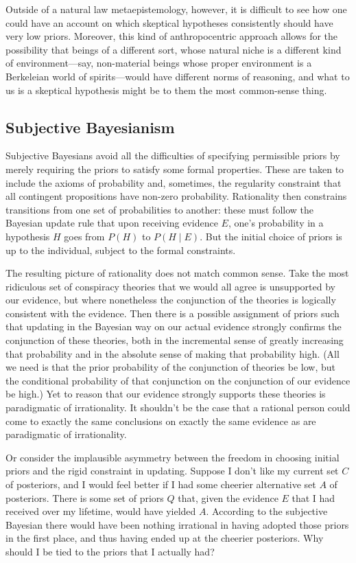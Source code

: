 Outside of a natural law metaepistemology, however, it is difficult to see how one could have an account on which
skeptical hypotheses consistently should have very low priors. Moreover, this kind of anthropocentric approach 
allows for the possibility that beings of a different sort, whose natural niche is a different kind of 
environment---say, non-material beings whose proper environment is a Berkeleian world of spirits---would have
different norms of reasoning, and what to us is a skeptical hypothesis might be to them the most common-sense thing.

\subsection{Subjective Bayesianism}
Subjective Bayesians avoid all the difficulties of specifying permissible priors by merely
requiring the priors to satisfy some formal properties. These are taken to include the
axioms of probability and, sometimes, the regularity constraint that all contingent 
propositions have non-zero probability. Rationality then constrains transitions from one
set of probabilities to another: these must follow the Bayesian update rule that upon
receiving evidence $E$, one's probability in a hypothesis $H$ goes from $P(H)$ to 
$P(H\mid E)$. But the initial choice of priors is up to the individual, subject to the
formal constraints.

The resulting picture of rationality does not match common sense. Take the most
ridiculous set of conspiracy theories that we would all agree is unsupported by our evidence, 
but where nonetheless the conjunction of the theories is logically consistent with the evidence.
Then there is a possible assignment of priors such that updating in the Bayesian way on our actual 
evidence strongly confirms the conjunction of these theories, both in the incremental sense of 
greatly increasing that probability and in the absolute sense of making that probability high. (All 
we need is that the prior probability of the conjunction of theories be low, but the conditional
probability of that conjunction on the conjunction of our evidence be high.) Yet to reason that
our evidence strongly supports these theories is paradigmatic of irrationality. It shouldn't be the
case that a rational person could come to exactly the same conclusions on exactly the same evidence
as are paradigmatic of irrationality.

Or consider the implausible asymmetry between the freedom in choosing initial priors and the
rigid constraint in updating. Suppose I don't like my current set $C$ of posteriors, and I would 
feel better if  I had some cheerier alternative set $A$ of posteriors. There is some set of priors $Q$ that, 
given the evidence $E$ that I had received over my lifetime, would have yielded $A$. According to 
the subjective Bayesian there would have been nothing irrational in having adopted those priors in 
the first place, and thus having ended up at the cheerier posteriors. Why should I be tied to the
priors that I actually had? 

